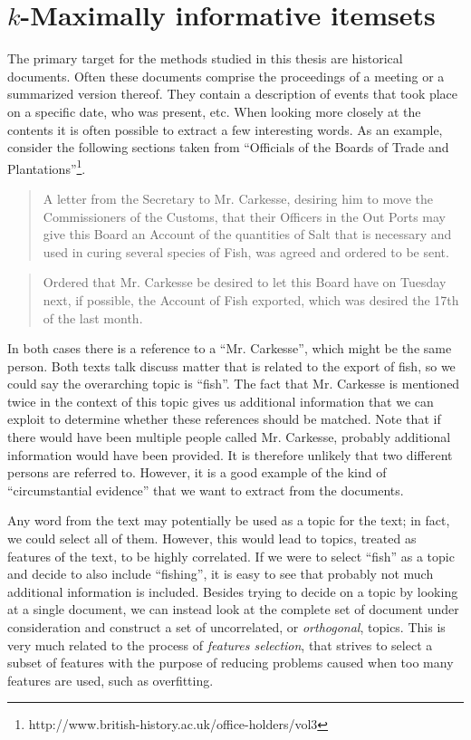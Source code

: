 \section{$k$-Maximally informative itemsets}
\label{sec:miki}

The primary target for the methods studied in this thesis are historical documents.
Often these documents comprise the proceedings of a meeting or a summarized version thereof.
They contain a description of events that took place on a specific date, who was present, etc.
When looking more closely at the contents it is often possible to extract a few interesting words.
As an example, consider the following sections taken from ``Officials of the Boards of Trade and Plantations''\footnote{http://www.british-history.ac.uk/office-holders/vol3}.

\begin{quote}
    A letter from the Secretary to Mr. Carkesse, desiring him to move the Commissioners of the Customs, that their Officers in the Out Ports may give this Board an Account of the quantities of Salt that is necessary and used in curing several species of Fish, was agreed and ordered to be sent.
\end{quote}

\begin{quote}
    Ordered that Mr. Carkesse be desired to let this Board have on Tuesday next, if possible, the Account of Fish exported, which was desired the 17th of the last month.
\end{quote}

\noindent In both cases there is a reference to a ``Mr. Carkesse'', which might be the same person.
Both texts talk discuss matter that is related to the export of fish, so we could say the overarching topic is ``fish''.
The fact that Mr. Carkesse is mentioned twice in the context of this topic gives us additional information that we can exploit to determine whether these references should be matched.
Note that if there would have been multiple people called Mr. Carkesse, probably additional information would have been provided.
It is therefore unlikely that two different persons are referred to.
However, it is a good example of the kind of ``circumstantial evidence'' that we want to extract from the documents.

Any word from the text may potentially be used as a topic for the text; in fact, we could select all of them.
However, this would lead to topics, treated as features of the text, to be highly correlated.
If we were to select ``fish'' as a topic and decide to also include ``fishing'', it is easy to see that probably not much additional information is included.
Besides trying to decide on a topic by looking at a single document, we can instead look at the complete set of document under consideration and construct a set of uncorrelated, or \emph{orthogonal}, topics.
This is very much related to the process of \emph{features selection}, that strives to select a subset of features with the purpose of reducing problems caused when too many features are used, such as overfitting.

